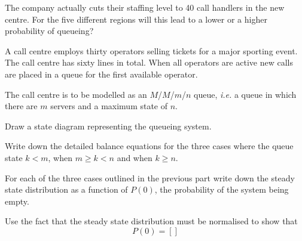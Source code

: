 \documentclass[12pt,fleqn]{article}
\begin{document}
\begin{exam}
\begin{question}
\begin{qupart}
The company actually cuts their staffing level to 40 call handlers in the new centre. For the five different regions will this lead to a lower or a higher probability of queueing?
\end{qupart}

\end{question}


\continued
\begin{question}
A call centre employs thirty operators selling tickets for a major sporting event. The call centre has sixty lines in total. When all operators are active new calls are placed in a queue for the first available operator.

The call centre is to be modelled as an $M$/$M$/$m$/$n$ queue, \emph{i.e.} a queue in which there are $m$ servers and a maximum state of $n$.
  
\begin{qupart}
Draw a state diagram representing the queueing system.
\mypercent[30]
\end{qupart}
%
\begin{qupart}
Write down the detailed balance equations for the three cases where the queue state $k<m$, when $m \geq k < n$ and when $k\geq n$. 
\mypercent[30] 
\end{qupart}

\begin{qupart}
For each of the three cases outlined in the previous part write down the steady state distribution as a function of $P(0)$, the probability of the system being empty. 
\end{qupart}
\begin{qupart}
Use the fact that the steady state distribution must be normalised to show that 
\begin{equation}
P(0)=\left[\right]
\end{equation}
\end{qupart}
\end{question}
\continued


\begin{question}
\begin{qupart}
\end{qupart}

\begin{qupart}
\end{qupart}

\begin{qupart}
\end{qupart}


\end{question}
\end{exam}
\end{document}
